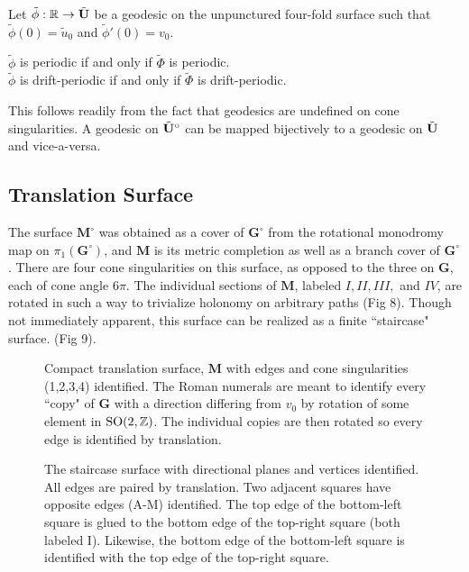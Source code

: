 \documentclass[]{article}
\def\bG{\mathbf{G}} \def\bGs{\mathbf{G}^\circ}
\def\bM{\mathbf{M}}
\def\bMs{\mathbf{M}^\circ}
\def\btUs{\btU^\circ}
\def\utild{\tilde{u}_0}
\def\phitild{\tilde{\Phi}}
\def\tildphi{\tilde{\phi}}
\def\SO{\mathrm{SO}}
\begin{document}
\begin{Def}
Let $\tildphi:\RR\rightarrow\btU$ be a geodesic on the unpunctured four-fold surface such that $\tildphi(0)=\utild$ and $\tildphi'(0)=v_0$.
\end{Def}

\begin{thm}
$\tildphi$ is periodic if and only if $\phitild$ is periodic.\\
$\tildphi$ is drift-periodic if and only if $\phitild$ is drift-periodic.
\end{thm}

This follows readily from the fact that geodesics are undefined on cone singularities. A geodesic on $\btUs$ can be mapped bijectively to a geodesic on  $\tilde{\mathbf{U}}$ and vice-a-versa.



\subsection{Translation Surface}
The surface $\bMs$ was obtained as a cover of $\bGs$ from the rotational monodromy map on $\pi_1(\bGs)$, and $\bM$ is its metric completion as well as a branch cover of $\bGs$. There are four cone singularities on this surface, as opposed to the three on $\bG$, each of cone angle $6\pi$. The individual sections of $\bM$, labeled $I,II,III,$ and $IV$, are rotated in such a way to trivialize holonomy on arbitrary paths (Fig 8). Though not immediately apparent, this surface can be realized as a finite ``staircase" surface. (Fig 9).

\begin{figure}[H]
\centering

\caption{Compact translation surface, $\mathbf{M}$ with edges and cone singularities (1,2,3,4) identified. The Roman numerals are meant to identify every ``copy" of $\bG$ with a direction differing from $v_0$ by rotation of some element in $\SO(2,\ZZ)$. The individual copies are then rotated so every edge is identified by translation.}
\label{fig:mtilda}
\end{figure}

\begin{figure}[H]
\centering

\caption{The staircase surface with directional planes and vertices identified. All edges are paired by translation. Two adjacent squares have opposite edges (A-M) identified. The top edge of the bottom-left square is glued to the bottom edge of the top-right square (both labeled I). Likewise, the bottom edge of the bottom-left square is identified with the top edge of the top-right square.}
\label{fig:staircase}
\end{figure}
\end{document}
